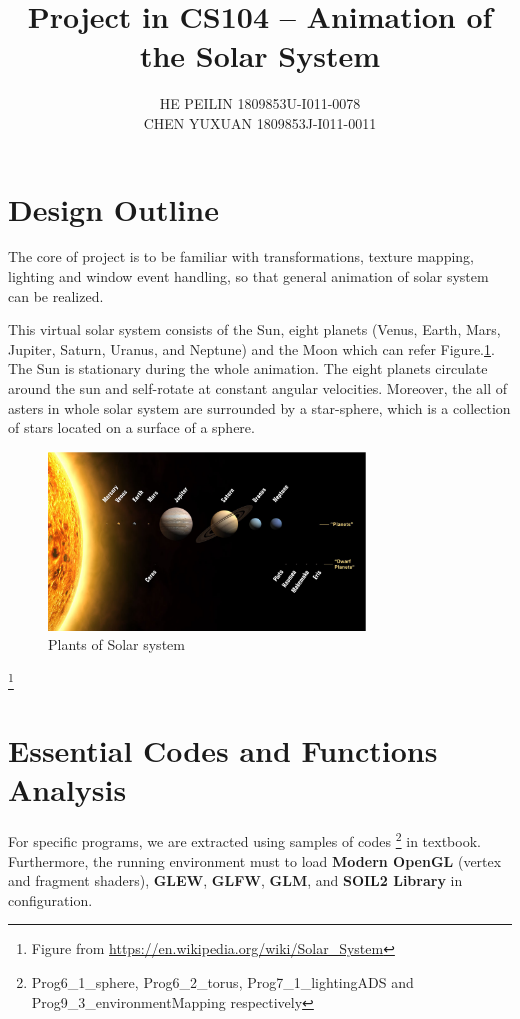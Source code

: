 \documentclass[12pt]{article}
\numberwithin{figure}{subsection}
\numberwithin{table}{subsection}
\numberwithin{equation}{subsection}
\begin{document}
\title{\textbf{Project in CS104 -- Animation of the Solar System}}
\author{HE PEILIN 1809853U-I011-0078\\CHEN YUXUAN 1809853J-I011-0011}
\date{}
\maketitle

\tableofcontents
\newpage

\section{Design Outline}
The core of project is to be familiar with transformations, texture mapping, lighting and
window event handling, so that general animation of solar system can be realized.

This virtual solar system consists of the Sun, eight
planets (Venus, Earth, Mars, Jupiter, Saturn, Uranus,
and Neptune) and the Moon which can refer Figure.\ref{fig:solar system}.
The Sun is stationary during the whole animation. The
eight planets circulate around the sun and self-rotate at
constant angular velocities. Moreover, the all of asters in whole solar system
are surrounded by a star-sphere, which is a collection of
stars located on a surface of a sphere.

\begin{figure}[!htbp]
	\centering
	\includegraphics[width=0.75\textwidth]{image/Planets2008.jpg}
	\caption{Plants of Solar system}
    \label{fig:solar system}
\end{figure}
\footnote{Figure from \url{https://en.wikipedia.org/wiki/Solar_System}}

\section{Essential Codes and Functions Analysis}
For specific programs, we are extracted using samples of codes
\footnote{Prog6\_1\_sphere, Prog6\_2\_torus, Prog7\_1\_lightingADS and Prog9\_3\_environmentMapping respectively  } 
in textbook.
Furthermore, the running environment must to load \textbf{Modern OpenGL}
(vertex and fragment shaders), \textbf{GLEW},
\textbf{GLFW}, \textbf{GLM}, and \textbf{SOIL2 Library} in configuration.
\end{document}
